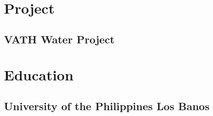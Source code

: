 \documentclass[top=0in]{deedy-resume-openfont}
\begin{document}
\begin{minipage}[t]{0.66\textwidth}

\section{Project}

\subsection{VATH Water Project}
\sectionsep


\section{Education}

\subsection{University of the Philippines Los Banos}
\sectionsep



%
%


\end{minipage}
\end{document}
